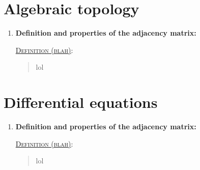 \documentclass[letterpaper, 12pt]{article}
\newcommand{\defn}[2]{\textsc{\underline{Definition (#1)}:}\begin{quote} #2\end{quote}}
\begin{document}
\section{Algebraic topology}
    \begin{enumerate}[resume]
    \item \textbf{Definition and properties of the adjacency matrix:}

        \defn{blah}{lol}
    \end{enumerate}

\section{Differential equations}
    \begin{enumerate}[resume]
    \item \textbf{Definition and properties of the adjacency matrix:}

        \defn{blah}{lol}
    \end{enumerate}
\end{document}
